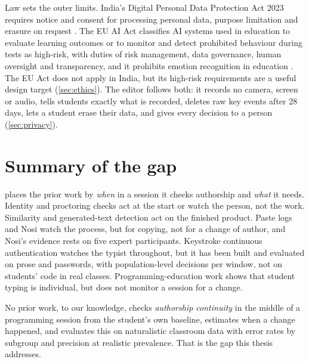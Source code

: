 Law sets the outer limits. India's Digital Personal Data Protection Act 2023
requires notice and consent for processing personal data, purpose
limitation and erasure on request \cite{dpdp2023}. The EU AI Act classifies
AI systems used in education to evaluate learning outcomes or to monitor and
detect prohibited behaviour during tests as high-risk, with duties of risk
management, data governance, human oversight and transparency, and it
prohibits emotion recognition in education \cite{euaiact2024}. The EU Act does
not apply in India, but its high-risk requirements are a useful design target
(\cref{sec:ethics}). The editor follows both: it records no camera, screen or
audio, tells students exactly what is recorded, deletes raw key events after
28 days, lets a student erase their data, and gives every decision to a person
(\cref{sec:privacy}).

\section{Summary of the gap}
\label{sec:rw-gap}
 places the prior work by \emph{when} in a session it checks
authorship and \emph{what} it needs. Identity and proctoring checks act at the
start or watch the person, not the work. Similarity and generated-text
detection act on the finished product. Paste logs and Nosi watch the process,
but for copying, not for a change of author, and Nosi's evidence rests on five
expert participants. Keystroke continuous authentication watches the typist
throughout, but it has been built and evaluated on prose and passwords, with
population-level decisions per window, not on students' code in real classes.
Programming-education work shows that student typing is individual, but does
not monitor a session for a change.

No prior work, to our knowledge, checks \emph{authorship continuity} in the
middle of a programming session from the student's own baseline, estimates
when a change happened, and evaluates this on naturalistic classroom data with
error rates by subgroup and precision at realistic prevalence. That is the
gap this thesis addresses.

